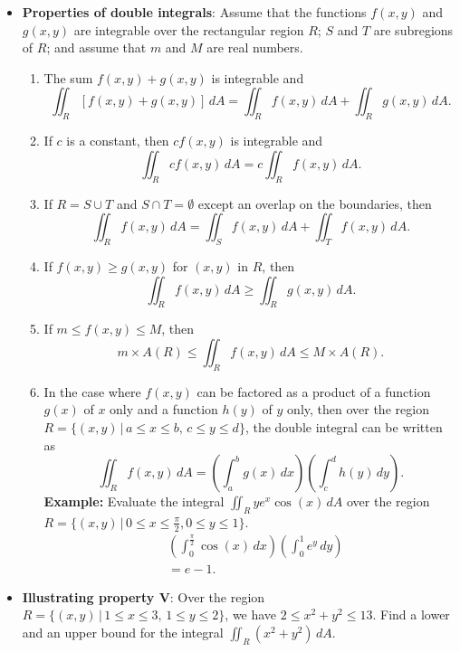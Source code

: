 \documentclass{report}
\begin{document}
\begin{itemize}
        \item \textbf{Properties of double integrals}:
            Assume that the functions $f(x,y)$ and $g(x,y)$ are integrable over the rectangular region $R$; $S$ and $T$ are subregions of $R$; and assume that $m$ and $M$ are real numbers.
            \begin{enumerate}[label=\Roman*.]
                \item The sum $f(x,y) + g(x,y)$ is integrable and
                    \[\iint_{R} [f(x,y) + g(x,y)] \, dA = \iint_{R} f(x,y) \, dA + \iint_{R} g(x,y) \, dA.\]
                \item If $c$ is a constant, then $cf(x,y)$ is integrable and
                    \[\iint_{R} cf(x,y) \, dA = c \iint_{R} f(x,y) \, dA.\]
                \item If $R = S \cup T$ and $S \cap T = \emptyset$ except an overlap on the boundaries, then
                    \[\iint_{R} f(x,y) \, dA = \iint_{S} f(x,y) \, dA + \iint_{T} f(x,y) \, dA.\]
                \item If $f(x,y) \geq g(x,y)$ for $(x,y)$ in $R$, then
                    \[\iint_{R} f(x,y) \, dA \geq \iint_{R} g(x,y) \, dA.\]
                \item If $m \leq f(x,y) \leq M$, then
                    \[m \times A(R) \leq \iint_{R} f(x,y) \, dA \leq M \times A(R).\]
                \item In the case where $f(x,y)$ can be factored as a product of a function $g(x)$ of $x$ only and a function $h(y)$ of $y$ only, then over the region $R = \{(x,y) \,|\, a \leq x \leq b, \, c \leq y \leq d\}$, the double integral can be written as
                    \[\iint_{R} f(x,y) \, dA = \left( \int_{a}^{b} g(x) \, dx \right) \left( \int_{c}^{d} h(y) \, dy \right).\]
                    \bigbreak \noindent 
                    \textbf{Example:} Evaluate the integral $\iint_{R} ye^{x} \cos(x) \, dA$ over the region $R = \{(x,y) \, | \, 0 \leq x \leq \frac{\pi}{2}, 0 \leq y \leq 1\}$.
                    \begin{align*}
                        &\left(\int_0^{\frac{\pi}{2}}\cos{\left(x\right)}\,dx\right)\left(\int_0^{1}e^{y}\,dy\right) \\
                        &=e-1
                    .\end{align*}
            \end{enumerate}
        \item \textbf{Illustrating property V}: Over the region $R = \{(x,y) \,|\, 1 \leq x \leq 3, \, 1 \leq y \leq 2\}$, we have $2 \leq x^2 + y^2 \leq 13$. Find a lower and an upper bound for the integral $\iint_{R} (x^2 + y^2) \, dA$.

\end{itemize}
\end{document}
